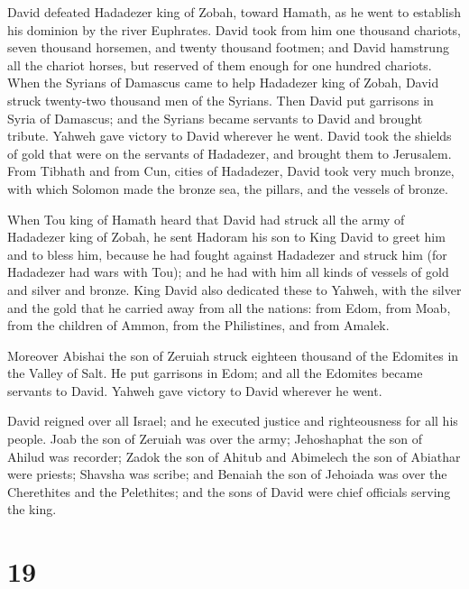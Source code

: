 David defeated Hadadezer king of Zobah, toward Hamath, as
he went to establish his dominion by the river Euphrates. 
David took from him one thousand chariots, seven thousand horsemen, and
twenty thousand footmen; and David hamstrung all the chariot horses, but
reserved of them enough for one hundred chariots.  When
the Syrians of Damascus came to help Hadadezer king of Zobah, David
struck twenty-two thousand men of the Syrians.  Then David
put garrisons in Syria of Damascus; and the Syrians became servants to
David and brought tribute. Yahweh gave victory to David wherever he
went.  David took the shields of gold that were on the
servants of Hadadezer, and brought them to Jerusalem. 
From Tibhath and from Cun, cities of Hadadezer, David took very much
bronze, with which Solomon made the bronze sea, the pillars, and the
vessels of bronze.

 When Tou king of Hamath heard that David had struck all
the army of Hadadezer king of Zobah,  he sent Hadoram his
son to King David to greet him and to bless him, because he had fought
against Hadadezer and struck him (for Hadadezer had wars with Tou); and
he had with him all kinds of vessels of gold and silver and bronze.
 King David also dedicated these to Yahweh, with the
silver and the gold that he carried away from all the nations: from
Edom, from Moab, from the children of Ammon, from the Philistines, and
from Amalek.

 Moreover Abishai the son of Zeruiah struck eighteen
thousand of the Edomites in the Valley of Salt.  He put
garrisons in Edom; and all the Edomites became servants to David. Yahweh
gave victory to David wherever he went.

 David reigned over all Israel; and he executed justice
and righteousness for all his people.  Joab the son of
Zeruiah was over the army; Jehoshaphat the son of Ahilud was recorder;
 Zadok the son of Ahitub and Abimelech the son of
Abiathar were priests; Shavsha was scribe;  and Benaiah
the son of Jehoiada was over the Cherethites and the Pelethites; and the
sons of David were chief officials serving the king.

\hypertarget{section-18}{%
\section{19}\label{section-18}}

